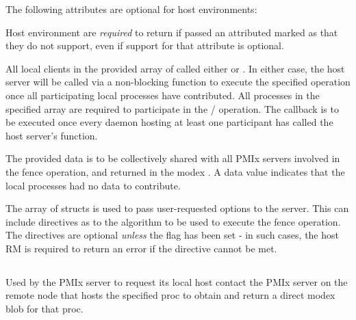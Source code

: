
\reqattrend

\optattrstart
The following attributes are optional for host environments:


\optattrend

\advicermstart
Host environment are \textit{required} to return  if passed an attributed marked as  that they do not support, even if support for that attribute is optional.
\advicermend

\descr

All local clients in the provided array of  called either  or .
In either case, the host server will be called via a non-blocking function to execute the specified operation once all participating local processes have contributed.
All processes in the specified  array are required to participate in the / operation.
The callback is to be executed once every daemon hosting at least one participant has called the host server's  function.

The provided data is to be collectively shared with all \ac{PMIx} servers involved in the fence operation, and returned in the modex .
A  data value indicates that the local processes had no data to contribute.

The array of  structs is used to pass user-requested options to the server.
This can include directives as to the algorithm to be used to execute the fence operation.
The directives are optional \emph{unless} the  flag has been set - in such cases, the host \ac{RM} is required to return an error if the directive cannot be met.


\subsection{}

\summary

Used by the PMIx server to request its local host contact the \ac{PMIx} server on the remote node that hosts the specified proc to obtain and return a direct modex blob for that proc.

